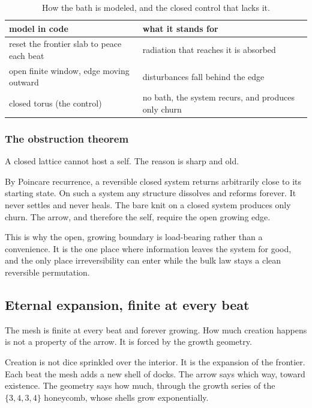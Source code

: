 \begin{table}[ht]
\centering
\begin{tabular}{@{}ll@{}}
\toprule
model in code & what it stands for \\
\midrule
reset the frontier slab to peace each beat & radiation that reaches it is absorbed \\
open finite window, edge moving outward & disturbances fall behind the edge \\
closed torus (the control) & no bath, the system recurs, and produces only churn \\
\bottomrule
\end{tabular}
\caption{How the bath is modeled, and the closed control that lacks it.}
\label{tab:bath-model}
\end{table}

\subsubsection{The obstruction theorem}

A closed lattice cannot host a self. The reason is sharp and old.

\begin{theorem}
By Poincare recurrence, a reversible closed system returns arbitrarily close to its starting state. On such a system any structure dissolves and reforms forever. It never settles and never heals. The bare knit on a closed system produces only churn. The arrow, and therefore the self, require the open growing edge.
\end{theorem}

This is why the open, growing boundary is load-bearing rather than a convenience. It is the one place where information leaves the system for good, and the only place irreversibility can enter while the bulk law stays a clean reversible permutation.

\subsection{Eternal expansion, finite at every beat}

The mesh is finite at every beat and forever growing. How much creation happens is not a property of the arrow. It is forced by the growth geometry.

Creation is not dice sprinkled over the interior. It is the expansion of the frontier. Each beat the mesh adds a new shell of docks. The arrow says which way, toward existence. The geometry says how much, through the growth series of the $\{3,4,3,4\}$ honeycomb, whose shells grow exponentially.

